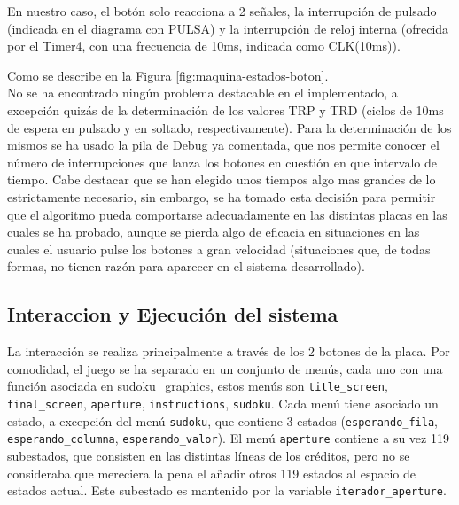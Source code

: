 \documentclass[12pt,letterpaper]{article}
\begin{document}
En nuestro caso, el botón solo reacciona a 2 señales, la interrupción
de pulsado (indicada en el diagrama con PULSA) y la interrupción de
reloj interna (ofrecida por el Timer4, con una frecuencia de 10ms,
indicada como CLK(10ms)).

Como se describe en la Figura \ref{fig:maquina-estados-boton}.\\
No se ha encontrado ningún problema destacable en el implementado, a
excepción quizás de la determinación de los valores TRP y TRD (ciclos
de 10ms de espera en pulsado y en soltado, respectivamente). Para la
determinación de los mismos se ha usado la pila de Debug ya comentada,
que nos permite conocer el número de interrupciones que lanza los
botones en cuestión en que intervalo de tiempo. Cabe destacar que se
han elegido unos tiempos algo mas grandes de lo estrictamente
necesario, sin embargo, se ha tomado esta decisión para permitir que
el algoritmo pueda comportarse adecuadamente en las distintas placas
en las cuales se ha probado, aunque se pierda algo de eficacia en
situaciones en las cuales el usuario pulse los botones a gran
velocidad (situaciones que, de todas formas, no tienen razón para
aparecer en el sistema desarrollado).

\subsection{Interaccion y Ejecución del sistema}
\label{subsec:interaction-ejecucion}
La interacción se realiza principalmente a través de los 2 botones de
la placa. 
Por comodidad, el juego se ha separado en un conjunto de menús, cada
uno con una función asociada en sudoku\_graphics, estos menús son
\texttt{title\_screen}, \texttt{final\_screen}, \texttt{aperture},
\texttt{instructions}, \texttt{sudoku}. Cada menú tiene asociado un
estado, a excepción del menú \texttt{sudoku}, que contiene 3 estados
(\texttt{esperando\_fila}, \texttt{esperando\_columna},
\texttt{esperando\_valor}). El menú \texttt{aperture} contiene a su
vez 119 subestados, que consisten en las distintas líneas de los
créditos, pero no se consideraba que mereciera la pena el añadir otros
119 estados al espacio de estados actual. Este subestado es mantenido
por la variable \texttt{iterador\_aperture}. 
\end{document}
